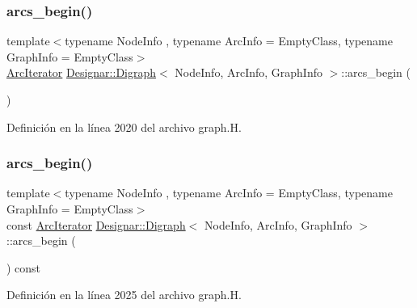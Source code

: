 \subsubsection{\texorpdfstring{arcs\+\_\+begin()}{arcs\_begin()}\hspace{0.1cm}{\footnotesize\ttfamily [1/4]}}
{\footnotesize\ttfamily template$<$typename Node\+Info , typename Arc\+Info  = Empty\+Class, typename Graph\+Info  = Empty\+Class$>$ \\
\hyperlink{class_designar_1_1_digraph_1_1_arc_iterator}{Arc\+Iterator} \hyperlink{class_designar_1_1_digraph}{Designar\+::\+Digraph}$<$ Node\+Info, Arc\+Info, Graph\+Info $>$\+::arcs\+\_\+begin (\begin{DoxyParamCaption}{ }\end{DoxyParamCaption})\hspace{0.3cm}{\ttfamily [inline]}}



Definición en la línea 2020 del archivo graph.\+H.

\mbox{\label{class_designar_1_1_digraph_a1334cd9030f2a409f03a611bb472f5cb}} 
\subsubsection{\texorpdfstring{arcs\+\_\+begin()}{arcs\_begin()}\hspace{0.1cm}{\footnotesize\ttfamily [2/4]}}
{\footnotesize\ttfamily template$<$typename Node\+Info , typename Arc\+Info  = Empty\+Class, typename Graph\+Info  = Empty\+Class$>$ \\
const \hyperlink{class_designar_1_1_digraph_1_1_arc_iterator}{Arc\+Iterator} \hyperlink{class_designar_1_1_digraph}{Designar\+::\+Digraph}$<$ Node\+Info, Arc\+Info, Graph\+Info $>$\+::arcs\+\_\+begin (\begin{DoxyParamCaption}{ }\end{DoxyParamCaption}) const\hspace{0.3cm}{\ttfamily [inline]}}



Definición en la línea 2025 del archivo graph.\+H.

\mbox{\label{class_designar_1_1_digraph_a3c1eeda482f59951e1191ea2e0dd514a}} 
